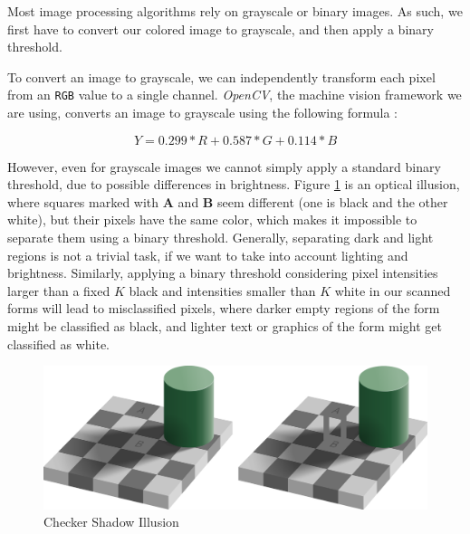 \documentclass[11pt, a4paper]{report}
\def\code#1{\texttt{#1}}
\begin{document}
Most image processing algorithms rely on grayscale or binary images. As such, we first have to convert our colored image to grayscale, and then apply a binary threshold.

To convert an image to grayscale, we can independently transform each pixel from an \code{RGB} value to a single channel. \textit{OpenCV}, the machine vision framework we are using, converts an image to grayscale using the following formula \cite{opencv-color-convention}:

\[Y = 0.299*R+0.587*G+0.114*B\]

However, even for grayscale images we cannot simply apply a standard binary threshold, due to possible differences in brightness. 
Figure \ref{checker-illusion} is an optical illusion, where squares marked with \textbf{A} and \textbf{B} seem different (one is black and the other white), but their pixels have the same color, which makes it impossible to separate them using a binary threshold. Generally, separating dark and light regions is not a trivial task, if we want to take into account lighting and brightness. Similarly, applying a binary threshold considering pixel intensities larger than a fixed $K$ black and intensities smaller than $K$ white in our scanned forms will lead to misclassified pixels, where darker empty regions of the form might be classified as black, and lighter text or graphics of the form might get classified as white.



\begin{figure}[!h]
	\centering
	\includegraphics[width=40em]{images/other/Checker_shadow_illusion.svg.png}
	\caption{Checker Shadow Illusion \cite{checker-illusion}}
	\label{checker-illusion}
\end{figure}
\end{document}
